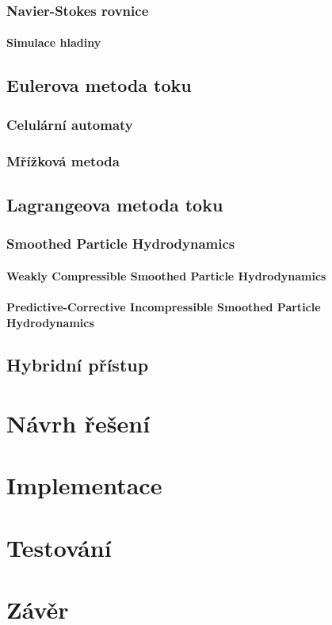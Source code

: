 \subsection{Navier-Stokes rovnice}
\subsubsection{Simulace hladiny}
\section{Eulerova metoda toku}
\subsection{Celulární automaty}
\subsection{Mřížková metoda}
\section{Lagrangeova metoda toku}
\subsection{Smoothed Particle Hydrodynamics}
\subsubsection{Weakly Compressible Smoothed Particle Hydrodynamics}
\subsubsection{Predictive-Corrective Incompressible Smoothed Particle Hydrodynamics}
\section{Hybridní přístup}




\chapter{Návrh řešení}
\label{chapter:navrh_resení}

\chapter{Implementace}
\label{chapter:implementace}

\chapter{Testování}
\label{chapter:testovani}

\chapter{Závěr}
\label{chapter:zaver}





